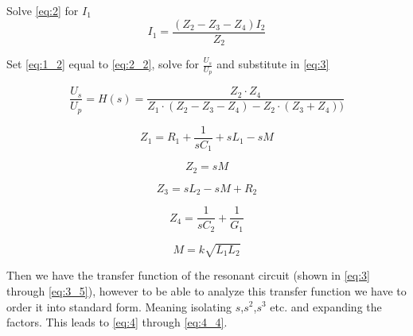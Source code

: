 Solve \cref{eq:2} for $I_1$
\begin{equation} \label{eq:2_2}
    I_1 = \frac{(Z_2 - Z_3 - Z_4) I_2}{Z_2}
\end{equation}

Set \cref{eq:1_2} equal to \cref{eq:2_2}, solve for $\frac{U_s}{U_p}$ and substitute in \cref{eq:3}

\begin{equation} \label{eq:3}
    \frac{U_s}{U_p} = H(s) = \frac{Z_2 \cdot Z_4}{Z_1 \cdot (Z_2 - Z_3 - Z_4) - Z_2 \cdot (Z_3 + Z_4))}
\end{equation}

\begin{equation} \label{eq:3_1}
    Z_1 = R_1 + \frac{1}{s C_1} + s L_1 - s M
\end{equation}

\begin{equation} \label{eq:3_2}
    Z_2 = s M
\end{equation}

\begin{equation} \label{eq:3_3}
    Z_3 = s L_2 - s M + R_2
\end{equation}

\begin{equation} \label{eq:3_4}
    Z_4 = \frac{1}{s C_2} + \frac{1}{G_1}
\end{equation}

\begin{equation} \label{eq:3_5}
    M = k \sqrt{L_1 L_2}
\end{equation}


Then we have the transfer function of the resonant circuit (shown in \cref{eq:3} through \cref{eq:3_5}), however to be able to analyze this transfer function we have to order it into standard form. Meaning isolating $s$,$s^2$,$s^3$ etc. and expanding the factors. This leads to \cref{eq:4} through \cref{eq:4_4}.


